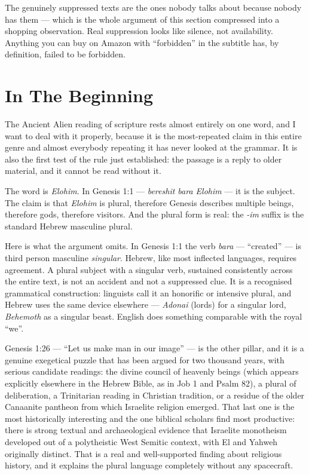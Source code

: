 \begin{funfact}
The genuinely suppressed texts are the ones nobody talks about because nobody has them ---
which is the whole argument of this section compressed into a shopping observation. Real
suppression looks like silence, not availability. Anything you can buy on Amazon with
``forbidden'' in the subtitle has, by definition, failed to be forbidden.
\end{funfact}

\section{In The Beginning}\label{sec:beginning}

The Ancient Alien reading of scripture rests almost entirely on one word, and I want to deal
with it properly, because it is the most-repeated claim in this entire genre and almost everybody
repeating it has never looked at the grammar. It is also the first test of the rule just
established: the passage is a reply to older material, and it cannot be read without it.

The word is \emph{Elohim}. In Genesis 1:1 --- \emph{bereshit bara Elohim} --- it is the subject.
The claim is that \emph{Elohim} is plural, therefore Genesis describes multiple beings, therefore
gods, therefore visitors. And the plural form is real: the \emph{-im} suffix is the standard
Hebrew masculine plural.

Here is what the argument omits. In Genesis 1:1 the verb \emph{bara} --- ``created'' --- is
third person masculine \emph{singular}. Hebrew, like most inflected languages, requires
agreement. A plural subject with a singular verb, sustained consistently across the entire text,
is not an accident and not a suppressed clue. It is a recognised grammatical construction:
linguists call it an honorific or intensive plural, and Hebrew uses the same device elsewhere ---
\emph{Adonai} (lords) for a singular lord, \emph{Behemoth} as a singular beast. English does
something comparable with the royal ``we''.

Genesis 1:26 --- ``Let us make man in our image'' --- is the other pillar, and it is a genuine
exegetical puzzle that has been argued for two thousand years, with serious candidate readings:
the divine council of heavenly beings (which appears explicitly elsewhere in the Hebrew Bible,
as in Job 1 and Psalm 82), a plural of deliberation, a Trinitarian reading in Christian
tradition, or a residue of the older Canaanite pantheon from which Israelite religion emerged.
That last one is the most historically interesting and the one biblical scholars find most
productive: there is strong textual and archaeological evidence that Israelite monotheism
developed out of a polytheistic West Semitic context, with El and Yahweh originally distinct.
That is a real and well-supported finding about religious history, and it explains the plural
language completely without any spacecraft.

